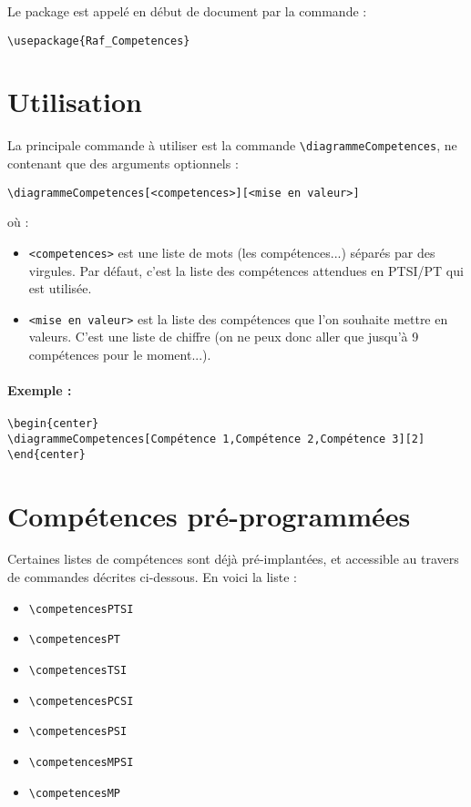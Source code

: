 \documentclass[a4paper,12pt]{article}
\begin{document}
		Le package est appelé en début de document par la commande :
		\begin{verbatim}
\usepackage{Raf_Competences}
		\end{verbatim}

	\section{Utilisation}
	
	La principale commande à utiliser est la commande \verb!\diagrammeCompetences!, ne contenant que des arguments optionnels :
	\begin{center}
		\verb!\diagrammeCompetences[<competences>][<mise en valeur>]!
	\end{center}
 	où :
	\begin{itemize}
		\item\verb!<competences>! est une liste de mots (les compétences...) séparés par des virgules.
					Par défaut, c'est la liste des compétences attendues en PTSI/PT qui est utilisée.
		\item\verb!<mise en valeur>! est la liste des compétences que l'on souhaite mettre en valeurs. C'est une liste de chiffre (on ne peux donc aller que jusqu'à 9 compétences pour le moment...).
	\end{itemize}

	\paragraph{Exemple :}
	\begin{verbatim}
\begin{center}
\diagrammeCompetences[Compétence 1,Compétence 2,Compétence 3][2]
\end{center}
	\end{verbatim}

\begin{center}
\end{center}



	\section{Compétences pré-programmées}

		Certaines listes de compétences sont déjà pré-implantées, et accessible au travers de commandes décrites ci-dessous. En voici la liste :
		\begin{itemize}
			\item \verb!\competencesPTSI!
			\item \verb!\competencesPT!
			\item \verb!\competencesTSI!
			\item \verb!\competencesPCSI!
			\item \verb!\competencesPSI!
			\item \verb!\competencesMPSI!
			\item \verb!\competencesMP!
		\end{itemize}
\end{document}
